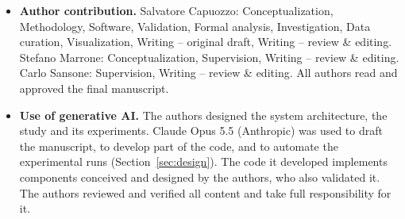 \documentclass[pdflatex,sn-mathphys-num]{sn-jnl}
\begin{document}
\begin{itemize}
\item \textbf{Author contribution.} Salvatore Capuozzo: Conceptualization, Methodology, Software, Validation, Formal analysis, Investigation, Data curation, Visualization, Writing -- original draft, Writing -- review \& editing. Stefano Marrone: Conceptualization, Supervision, Writing -- review \& editing. Carlo Sansone: Supervision, Writing -- review \& editing. All authors read and approved the final manuscript.
\item \textbf{Use of generative AI.} The authors designed the system architecture, the study and its experiments. Claude Opus 5.5 (Anthropic) was used to draft the manuscript, to develop part of the code, and to automate the experimental runs (Section~\ref{sec:design}). The code it developed implements components conceived and designed by the authors, who also validated it. The authors reviewed and verified all content and take full responsibility for it.
\end{itemize}
\end{document}
